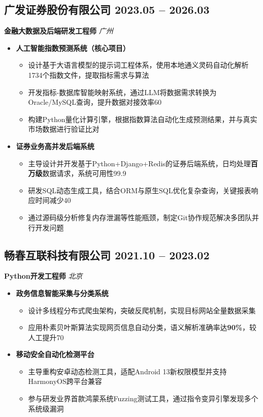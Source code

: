 \documentclass[11pt, a4paper]{article}
\newcommand{\dates}[1]{\hfill\textcolor{light}{\small #1}}  %
\begin{document}
\subsection*{广发证券股份有限公司 \dates{2023.05 -- 2026.03}}
\textbf{金融大数据及后端研发工程师} \hfill \textit{广州}

\begin{itemize}
    \item \textbf{人工智能指数预测系统（核心项目）}
    \begin{itemize}
        \item 设计基于大语言模型的提示词工程体系，使用本地通义灵码自动化解析1734个指数文件，提取指标需求与算法
        \item 开发指标-数据库智能映射系统，通过LLM将数据需求转换为Oracle/MySQL查询，提升数据对接效率60%
        \item 构建Python量化计算引擎，根据指数算法自动化生成预测结果，并与真实市场数据进行验证比对
    \end{itemize}
    
    \item \textbf{证券业务高并发后端系统}
    \begin{itemize}
        \item 主导设计并开发基于Python+Django+Redis的证券后端系统，日均处理\textbf{百万级}数据请求，系统可用性99.9%
        \item 研发SQL动态生成工具，结合ORM与原生SQL优化复杂查询，关键报表响应时间减少40%
        \item 通过源码级分析修复内存泄漏等性能瓶颈，制定Git协作规范解决多团队并行开发问题
    \end{itemize}
\end{itemize}

\vspace{0.5em}

\subsection*{畅春互联科技有限公司 \dates{2021.10 -- 2023.02}}
\textbf{Python开发工程师} \hfill \textit{北京}

\begin{itemize}
    \item \textbf{政务信息智能采集与分类系统}
    \begin{itemize}
        \item 设计多线程分布式爬虫架构，突破反爬机制，实现目标网站全量数据采集
        \item 应用朴素贝叶斯算法实现网页信息自动分类，语义解析准确率达\textbf{90\%}，较人工提升70%
    \end{itemize}
    
    \item \textbf{移动安全自动化检测平台}
    \begin{itemize}
        \item 主导重构安卓动态检测工具，适配Android 13新权限模型并支持HarmonyOS跨平台兼容
        \item 参与研发业界首款鸿蒙系统Fuzzing测试工具，通过指令变异引擎发现多个系统级漏洞
    \end{itemize}
\end{itemize}
\end{document}
